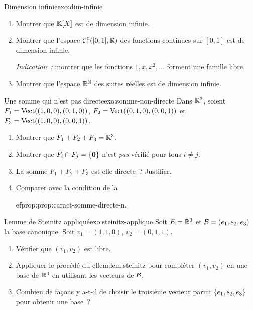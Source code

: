 \begin{exercise}{\challenging{} Dimension infinie}{exo:dim-infinie}
  \begin{enumerate}[label=(\alph*)]
    \item Montrer que ${\mathbb{K}}[X]$ est de dimension infinie.
    \item Montrer que l'espace ${\mathcal{C}}^0([0,1],{\mathbb{R}})$ des fonctions continues
      sur $[0,1]$ est de dimension infinie.

      \emph{Indication~:} montrer que les fonctions $1,x,x^2,\ldots$
      forment une famille libre.
    \item Montrer que l'espace ${\mathbb{R}}^{\mathbb{N}}$ des suites réelles est de
      dimension infinie.
  \end{enumerate}
\end{exercise}

\begin{exercise}{\challenging{} Une somme qui n'est pas directe}{exo:somme-non-directe}
  Dans ${\mathbb{R}}^3$, soient $F_1=\operatorname{Vect}((1,0,0),(0,1,0))$,
  $F_2=\operatorname{Vect}((0,1,0),(0,0,1))$ et $F_3=\operatorname{Vect}((1,0,0),(0,0,1))$.
  \begin{enumerate}[label=(\alph*)]
    \item Montrer que $F_1+F_2+F_3={\mathbb{R}}^3$.
    \item Montrer que $F_i\cap F_j=\left\{\mathbf{0}\right\}$ n'est \emph{pas}
      vérifié pour tous $i\neq j$.
    \item La somme $F_1+F_2+F_3$ est-elle directe~? Justifier.
    \item Comparer avec la condition de la
      
ef{prop:prop:caract-somme-directe-n}.
  \end{enumerate}
\end{exercise}

\begin{exercise}{\challenging{} Lemme de Steinitz appliqué}{exo:steinitz-applique}
  Soit $E={\mathbb{R}}^3$ et ${\mathcal{B}}=(e_1,e_2,e_3)$ la base canonique. Soit
  $v_1=(1,1,0)$, $v_2=(0,1,1)$.
  \begin{enumerate}[label=(\alph*)]
    \item Vérifier que $(v_1,v_2)$ est libre.
    \item Appliquer le procédé du 
ef{lem:lem:steinitz} pour compléter
      $(v_1,v_2)$ en une base de ${\mathbb{R}}^3$ en utilisant les vecteurs de
      ${\mathcal{B}}$.
    \item Combien de façons y a-t-il de choisir le troisième vecteur
      parmi $\left\{e_1,e_2,e_3\right\}$ pour obtenir une base~?
  \end{enumerate}
\end{exercise}

